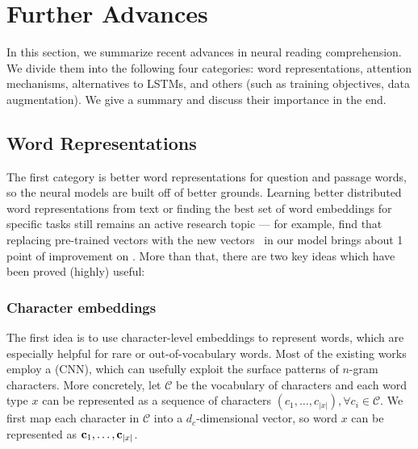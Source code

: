 
\section{Further Advances}
\label{sec:advances}

In this section, we summarize recent advances in neural reading comprehension. We divide them into the following four categories: {word representations}, {attention mechanisms}, {alternatives to LSTMs}, and {others} (such as training objectives, data augmentation). We give a summary and discuss their importance in the end.


\subsection{Word Representations}
The first category is better word representations for question and passage words, so the neural models are built off of better grounds. Learning better distributed word representations from text or finding the best set of word embeddings for specific tasks still remains an active research topic --- for example,  find that replacing  pre-trained vectors with the new  vectors~\cite{bojanowski2017enriching} in our model brings about 1 point of improvement on . More than that, there are two key ideas which have been proved (highly) useful:

\subsubsection*{Character embeddings}
The first idea is to use character-level embeddings to represent words, which are especially helpful for rare or out-of-vocabulary words. Most of the existing works employ a  (CNN), which can usefully exploit the surface patterns of $n$-gram characters. More concretely, let  $\mathcal{C}$ be the vocabulary of characters and each word type $x$ can be represented as a sequence of characters $(c_1, \ldots, c_{|x|}), \forall c_i \in \mathcal{C}$. We first map each character in $\mathcal{C}$ into a $d_c$-dimensional vector, so word $x$ can be represented as $\mathbf{c}_1, \ldots, \mathbf{c}_{|x|}$.

